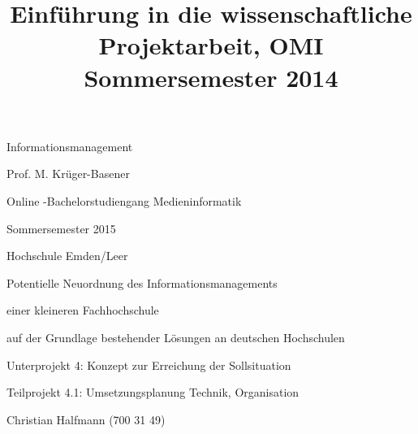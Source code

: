 \documentclass[a4paper]{article}
\title{Einführung in die wissenschaftliche Projektarbeit, OMI Sommersemester 2014}
\begin{document}
\clearpage\setcounter{page}{1}\pagestyle{Standard}
\thispagestyle{FirstPage}

\bigskip


\bigskip

{\centering\sffamily
Informationsmanagement
\par}


\bigskip

{\centering\sffamily
Prof. M. Krüger-Basener
\par}

{\centering\sffamily
Online -Bachelorstudiengang Medieninformatik
\par}

{\centering\sffamily
Sommersemester 2015
\par}

{\centering\sffamily
Hochschule Emden/Leer
\par}


\bigskip


\bigskip


\bigskip


\bigskip


\bigskip


\bigskip


\bigskip

{\centering\sffamily
Potentielle Neuordnung des Informationsmanagements 
\par}

{\centering\sffamily
einer kleineren Fachhochschule 
\par}

{\centering\sffamily
auf der Grundlage bestehender Lösungen an deutschen Hochschulen
\par}


\bigskip

{\centering\sffamily
Unterprojekt 4: Konzept zur Erreichung der Sollsituation
\par}

{\centering\sffamily
Teilprojekt 4.1: Umsetzungsplanung Technik, Organisation 
\par}


\bigskip


\bigskip


\bigskip


\bigskip


\bigskip


\bigskip


\bigskip


\bigskip

{\centering\sffamily
Christian Halfmann (700 31 49)
\par}
\end{document}

